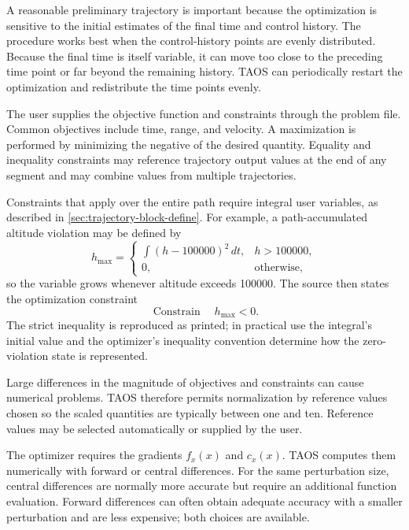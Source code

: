 A reasonable preliminary trajectory is important because the optimization is
sensitive to the initial estimates of the final time and control history. The procedure
works best when the control-history points are evenly distributed. Because the final
time is itself variable, it can move too close to the preceding time point or far beyond
the remaining history. TAOS can periodically restart the optimization and
redistribute the time points evenly.


The user supplies the objective function and constraints through the problem file.
Common objectives include time, range, and velocity. A maximization is performed
by minimizing the negative of the desired quantity. Equality and inequality
constraints may reference trajectory output values at the end of any segment and may
combine values from multiple trajectories.

Constraints that apply over the entire path require integral user variables, as
described in \cref{sec:trajectory-block-define}. For example, a path-accumulated
altitude violation may be defined by
\begin{equation}
  h_{\max}=
  \begin{cases}
    \displaystyle\int (h-100000)^2\,dt, & h>100000,\\[4pt]
    0, & \text{otherwise},
  \end{cases}
  \label{eq:maximum-altitude-integral}
\end{equation}
so the variable grows whenever altitude exceeds \SI{100000}{\foot}. The source then
states the optimization constraint
\begin{equation}
  \operatorname{Constrain}\quad h_{\max}<0.
  \label{eq:maximum-altitude-constraint}
\end{equation}
The strict inequality is reproduced as printed; in practical use the integral's initial
value and the optimizer's inequality convention determine how the zero-violation
state is represented.

Large differences in the magnitude of objectives and constraints can cause numerical
problems. TAOS therefore permits normalization by reference values chosen so the
scaled quantities are typically between one and ten. Reference values may be
selected automatically or supplied by the user.


The optimizer requires the gradients $f_x(x)$ and $c_x(x)$. TAOS computes them
numerically with forward or central differences. For the same perturbation size,
central differences are normally more accurate but require an additional function
evaluation. Forward differences can often obtain adequate accuracy with a smaller
perturbation and are less expensive; both choices are available.

